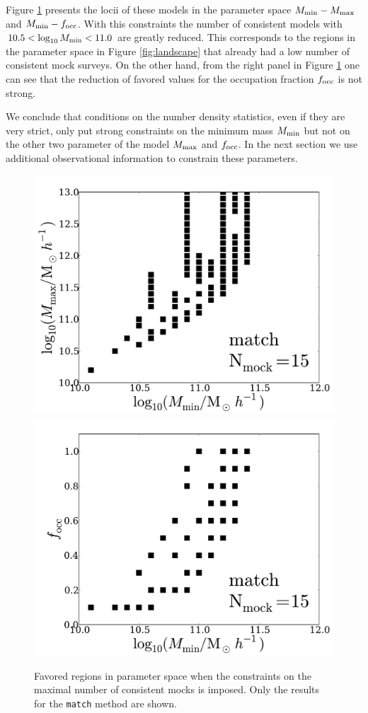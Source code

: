 \documentclass[usenatbib]{mn2e}
\begin{document}
{Figure \ref{fig:restriction_mock} presents the locii of these models
in the parameter space $M_{\rm min}-M_{\rm max}$ and $M_{\rm
  min}-f_{\rm occ}$. With this constraints the
number of consistent models with  $10.5 < \log_{10}M_{\rm min}< 11.0$ are
greatly reduced. This corresponds to the regions in the parameter
space in Figure \ref{fig:landscape} that already had a low number of
consistent mock surveys. On the other hand, from the right panel in
Figure \ref{fig:restriction_mock} one can see that the reduction of
favored values for the occupation fraction $f_{\rm occ}$ is not strong. 

We conclude that conditions on the number density statistics, even if they are
very strict, only put strong constraints on the minimum mass $M_{\rm
  min}$ but not on the other two parameter of the model $M_{\rm max}$
and $f_{\rm occ}$. In the next section we use additional observational
information to constrain these parameters.

\begin{figure}
\begin{center}
\includegraphics[width=0.46\linewidth,angle=0]{Fig5_match_mass_mock.pdf} 
\hspace{5mm}
\includegraphics[width=0.46\linewidth,angle=0]{Fig5_match_f_occ_mock.pdf}
\end{center}  
\caption{Favored regions in parameter space when the constraints on
  the maximal number of consistent mocks is imposed. Only the results
  for the {\texttt{match}} method are shown.
  \label{fig:restriction_mock}}  
\end{figure}



}
\end{document}

